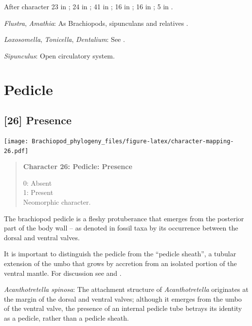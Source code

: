 \documentclass[openany]{book}
\begin{document}
After character 23 in \citet{Haszprunar1996}; 24 in
\citet{Haszprunar2000}; 41 in \citet{Rouse1999}; 16 in
\citet{Scheltema1993}; 16 in \citet{Vinther2008}; 5 in
\citet{Haszprunar2008}.

\hypertarget{Amathia-coding-25}{}
\emph{Flustra}, \emph{Amathia}: As Brachiopods, sipunculans and
relatives \citep{Ruppert1983}.

\hypertarget{Dentalium-coding-25}{}
\emph{Loxosomella}, \emph{Tonicella}, \emph{Dentalium}: See
\citet{Haszprunar2008}.

\hypertarget{Sipunculus-coding-25}{}
\emph{Sipunculus}: Open circulatory system.

\section{Pedicle}\label{pedicle}

\subsection*{{[}26{]} Presence}\label{presence}

\texttt{[image: Brachiopod\_phylogeny\_files/figure-latex/character-mapping-26.pdf]}

\begin{quote}
\textbf{Character 26: Pedicle: Presence}

0: Absent\\
1: Present\\
Neomorphic character.
\end{quote}

The brachiopod pedicle is a fleshy protuberance that emerges from the
posterior part of the body wall -- as denoted in fossil taxa by its
occurrence between the dorsal and ventral valves.

It is important to distinguish the pedicle from the ``pedicle sheath'',
a tubular extension of the umbo that grows by accretion from an isolated
portion of the ventral mantle. For discussion see
\citet{Holmer2018Theattachment} and \citet{Bassett2017Earliestontogeny}.

\hypertarget{Acanthotretella_spinosa-coding-26}{}
\emph{Acanthotretella spinosa}: The attachment structure of
\emph{Acanthotretella} originates at the margin of the dorsal and
ventral valves; although it emerges from the umbo of the ventral valve,
the presence of an internal pedicle tube betrays its identity as a
pedicle, rather than a pedicle sheath.
\end{document}
